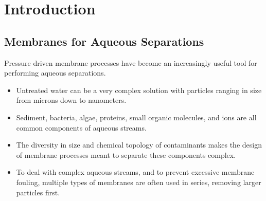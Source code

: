 \chapter{Introduction}\label{chapter:intro}

  \section{Membranes for Aqueous Separations}
  
  Pressure driven membrane processes have become an increasingly useful tool for
  performing aqueous separations.
  \begin{itemize}
    \item Untreated water can be a very complex solution with particles ranging
    in size from microns down to nanometers.~\cite{goosen_fouling_2005}
    \item Sediment, bacteria, algae, proteins, small organic molecules, and ions
    are all common components of aqueous streams.~\cite{werber_materials_2016}
    \item The diversity in size and chemical topology of contaminants makes the
    design of membrane processes meant to separate these components complex.
    \item To deal with complex aqueous streams, and to prevent excessive membrane
    fouling, multiple types of membranes are often used in series, removing 
    larger particles first.~\cite{suk_membranebased_2006}
  \end{itemize}
  
